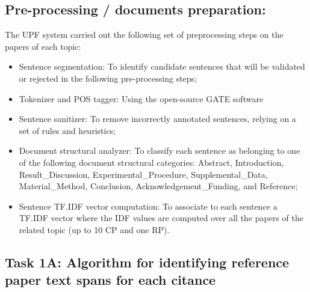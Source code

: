 \documentclass[11pt]{article}
\begin{document}
\subsection{Pre-processing / documents preparation:}
The UPF system carried out the following set of preprocessing steps on the 
papers of each topic:
\begin{itemize}
\item{Sentence segmentation:} To identify candidate sentences that will be 
validated or rejected in the following pre-processing steps;
\item{Tokenizer and POS tagger:} Using the open-source GATE software
\item{Sentence sanitizer:} To remove incorrectly annotated sentences, 
relying on a set of rules and heuristics;
\item{Document structural analyzer:} To classify each sentence as belonging 
to one of the following document structural categories: Abstract, 
Introduction, Result\_Discussion, Experimental\_Procedure, 
Supplemental\_Data, Material\_Method, Conclusion, Acknowledgement\_Funding, 
and Reference;
\item{Sentence TF.IDF vector computation:} To associate to each sentence a 
TF.IDF vector where the IDF values are computed over all the papers of the 
related topic (up to 10 CP and one RP).
\end{itemize}

\subsection{Task 1A: Algorithm for identifying reference paper text spans for each citance}
\end{document}
